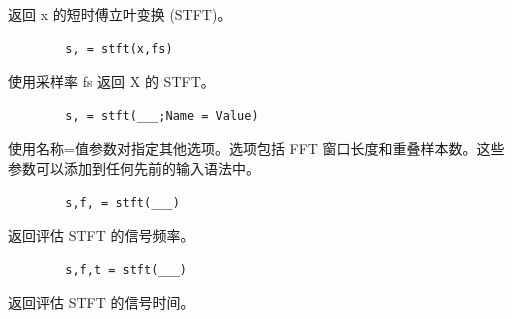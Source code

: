 \documentclass{article}
\begin{document}
	返回 x 的短时傅立叶变换 (STFT)。
	
	\begin{verbatim}
		s, = stft(x,fs)
	\end{verbatim}
	
	使用采样率 fs 返回 X 的 STFT。
	
	\begin{verbatim}
		s, = stft(___;Name = Value)
	\end{verbatim}
	
	使用名称=值参数对指定其他选项。选项包括 FFT 窗口长度和重叠样本数。这些参数可以添加到任何先前的输入语法中。
	
	\begin{verbatim}
		s,f, = stft(___)
	\end{verbatim}
	
	返回评估 STFT 的信号频率。
	
	\begin{verbatim}
		s,f,t = stft(___)
	\end{verbatim}
	
	返回评估 STFT 的信号时间。
	
\end{document}
